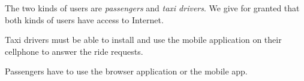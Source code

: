 The two kinds of users are \emph{passengers} and \emph{taxi drivers}.
We give for granted that both kinds of users have access to Internet.

Taxi drivers must be able to install and use the mobile application on their cellphone to answer the ride requests. 

Passengers have to use the browser application or the mobile app.

